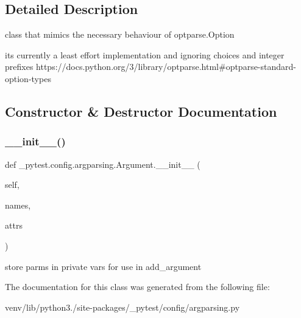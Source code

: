 \subsection{Detailed Description}
\begin{DoxyVerb}class that mimics the necessary behaviour of optparse.Option

its currently a least effort implementation
and ignoring choices and integer prefixes
https://docs.python.org/3/library/optparse.html#optparse-standard-option-types
\end{DoxyVerb}
 

\subsection{Constructor \& Destructor Documentation}
\mbox{\label{class__pytest_1_1config_1_1argparsing_1_1_argument_a89fae6a5de76be148efe81f8e36cc444}} 
\subsubsection{\texorpdfstring{\+\_\+\+\_\+init\+\_\+\+\_\+()}{\_\_init\_\_()}}
{\footnotesize\ttfamily def \+\_\+pytest.\+config.\+argparsing.\+Argument.\+\_\+\+\_\+init\+\_\+\+\_\+ (\begin{DoxyParamCaption}\item[{}]{self,  }\item[{}]{names,  }\item[{}]{attrs }\end{DoxyParamCaption})}

\begin{DoxyVerb}store parms in private vars for use in add_argument\end{DoxyVerb}
 

The documentation for this class was generated from the following file\+:\begin{DoxyCompactItemize}
\item 
venv/lib/python3./site-\/packages/\+\_\+pytest/config/argparsing.\+py\end{DoxyCompactItemize}
